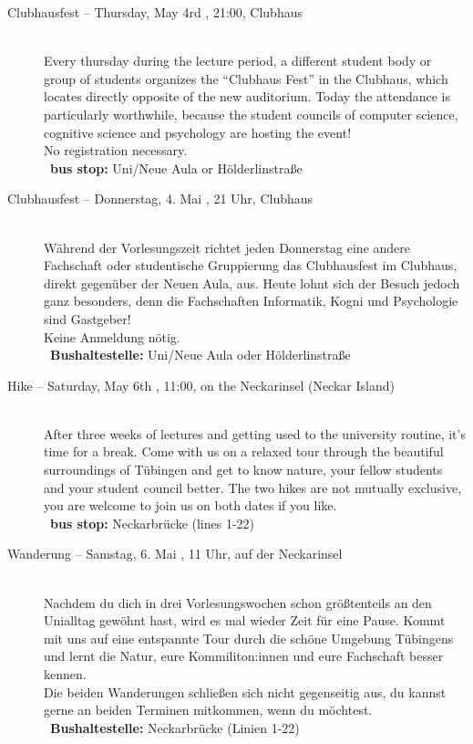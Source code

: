 \begin{description}
\ifml
    \item[Clubhausfest -- Thursday, May 4rd \YEAR, 21:00, Clubhaus]\ \\
	Every thursday during the lecture period, a different student body or group of students organizes the "`Clubhaus Fest"' in
	the Clubhaus, which locates directly opposite of the new auditorium. Today the attendance is particularly worthwhile, because
	the student councils of computer science, cognitive science and psychology are hosting the event! \\
	No registration necessary.\\
	~\textbf{bus stop:} Uni/Neue Aula or Hölderlinstraße
\else
    \item[Clubhausfest -- Donnerstag, 4. Mai \YEAR, 21 Uhr, Clubhaus]\ \\
	Während der Vorlesungszeit richtet jeden Donnerstag eine andere Fachschaft oder studentische Gruppierung das Clubhausfest
	im Clubhaus, direkt gegenüber der Neuen Aula, aus. Heute lohnt sich der Besuch jedoch ganz besonders, denn die Fachschaften
	Informatik, Kogni und Psychologie sind Gastgeber! \\
	Keine Anmeldung nötig.\\
	~\textbf{Bushaltestelle:} Uni/Neue Aula oder Hölderlinstraße
\fi

\ifbachelor \pagebreak \fi
\ifmaster \ifbinfo \else \pagebreak \fi \fi

\ifml
	\item[Hike -- Saturday, May 6th \YEAR, 11:00, on the Neckarinsel (Neckar Island)]~\\
	After three weeks of lectures and getting used to the university routine, it's time for a break.
	Come with us on a relaxed tour through the beautiful surroundings of Tübingen and get to know nature, your fellow students and your student council better.
	The two hikes are not mutually exclusive, you are welcome to join us on both dates if you like.\\
	~\textbf{bus stop:} Neckarbrücke (lines 1-22)
\else
	\item[Wanderung -- Samstag, 6. Mai \YEAR, 11 Uhr, auf der Neckarinsel]~\\
	Nachdem du dich in drei Vorlesungswochen schon größtenteils an den Unialltag gewöhnt hast, wird es mal wieder Zeit für eine Pause.
	Kommt mit uns auf eine entspannte Tour durch die schöne Umgebung Tübingens und lernt die Natur, eure Kommiliton:innen und eure Fachschaft besser kennen.\\
	Die beiden Wanderungen schließen sich nicht gegenseitig aus, du kannst gerne an beiden Terminen mitkommen, wenn du möchtest.\\
	~\textbf{Bushaltestelle:} Neckarbrücke (Linien 1-22)
\fi


\end{description}
